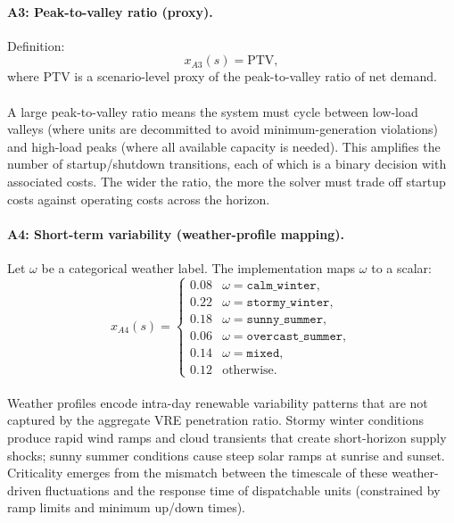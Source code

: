 \documentclass{article}
\begin{document}
\paragraph{A3: Peak-to-valley ratio (proxy).}
Definition:
\begin{equation}
x_{A3}(s)=\mathrm{PTV},
\end{equation}
where $\mathrm{PTV}$ is a scenario-level proxy of the peak-to-valley ratio of net demand.

\paragraph{}A large peak-to-valley ratio means the system must cycle between low-load valleys (where units are decommitted to avoid minimum-generation violations) and high-load peaks (where all available capacity is needed). This amplifies the number of startup/shutdown transitions, each of which is a binary decision with associated costs. The wider the ratio, the more the solver must trade off startup costs against operating costs across the horizon.

\paragraph{A4: Short-term variability (weather-profile mapping).}
Let $\omega$ be a categorical weather label. The implementation maps $\omega$ to a scalar:
\begin{equation}
x_{A4}(s)=
\begin{cases}
0.08 & \omega=\texttt{calm\_winter},\\
0.22 & \omega=\texttt{stormy\_winter},\\
0.18 & \omega=\texttt{sunny\_summer},\\
0.06 & \omega=\texttt{overcast\_summer},\\
0.14 & \omega=\texttt{mixed},\\
0.12 & \text{otherwise.}
\end{cases}
\end{equation}

\paragraph{}Weather profiles encode intra-day renewable variability patterns that are not captured by the aggregate VRE penetration ratio. Stormy winter conditions produce rapid wind ramps and cloud transients that create short-horizon supply shocks; sunny summer conditions cause steep solar ramps at sunrise and sunset. Criticality emerges from the mismatch between the timescale of these weather-driven fluctuations and the response time of dispatchable units (constrained by ramp limits and minimum up/down times).
\end{document}
